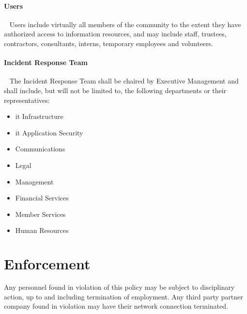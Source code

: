 \paragraph*{Users}~\newline{}
Users include virtually all members of the \OrganizationName{} community to the extent they have authorized access to information resources, and may include staff, trustees, contractors, consultants, interns, temporary employees and volunteers.
\paragraph*{Incident Response Team}~\newline{}
The Incident Response Team shall be chaired by Executive Management and shall include, but will not be limited to, the following departments or their representatives:
\begin{itemize}
\item
\gls{it} Infrastructure
\item
\gls{it} Application Security
\item
Communications
\item
Legal
\item
Management
\item
Financial Services
\item
Member Services
\item
Human Resources
\end{itemize}

\section{Enforcement}
Any \OrganizationName{} personnel found in violation of this policy may be subject to disciplinary action, up to and including termination of employment.  
Any third party partner company found in violation may have their network connection terminated. 

